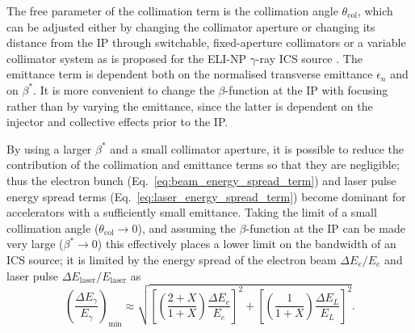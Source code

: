 \documentclass[../main.tex]{subfiles}
\begin{document}
The free parameter of the collimation term is the collimation angle $\theta_{\mathrm{col}}$, which can be adjusted either by changing the collimator aperture or changing its distance from the IP through switchable, fixed-aperture collimators or a variable collimator system as is proposed for the ELI-NP $\gamma$-ray ICS source \cite{paterno2017collimation}. The emittance term is dependent both on the normalised transverse emittance $\epsilon_{n}$ and on $\beta^{*}$. It is more convenient to change the $\beta$-function at the IP with focusing rather than by varying the emittance, since the latter is dependent on the injector and collective effects prior to the IP. 

By using a larger $\beta^{*}$ and a small collimator aperture, it is possible to reduce the contribution of the collimation and emittance terms so that they are negligible; thus the electron bunch (Eq.~\ref{eq:beam_energy_spread_term}) and laser pulse energy spread terms (Eq.~\ref{eq:laser_energy_spread_term}) become dominant for accelerators with a sufficiently small emittance. Taking the limit of a small collimation angle ($\theta_{\mathrm{col}}\rightarrow 0$), and assuming the $\beta$-function at the IP can be made very large ($\beta^{*}\rightarrow 0$) this effectively places a lower limit on the bandwidth of an ICS source; it is limited by the energy spread of the electron beam $\Delta E_{e}/E_{e}$ and laser pulse $\Delta E_{\mathrm{laser}}/E_{\mathrm{laser}}$ as 
\begin{equation}
\left(\frac{\Delta E_{\gamma}}{E_{\gamma}}\right)_{\mathrm{min}} \approx \sqrt{\left[\left(\frac{2+X}{1+X}\right)\frac{\Delta E_{e}}{E_{e}}\right]^{2} + \left[\left(\frac{1}{1+X}\right)\frac{\Delta E_{L}}{E_{L}}\right]^{2}}.
\label{eq:bandwidth_limitation_minimum}
\end{equation}
\end{document}

